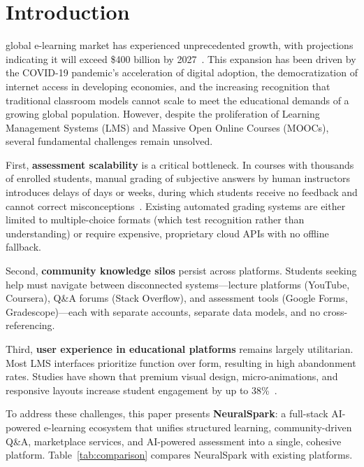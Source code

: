 \documentclass[conference]{IEEEtran}
\begin{document}
\section{Introduction}
 global e-learning market has experienced unprecedented growth, with projections indicating it will exceed \$400 billion by 2027~\cite{elearn_market}. This expansion has been driven by the COVID-19 pandemic's acceleration of digital adoption, the democratization of internet access in developing economies, and the increasing recognition that traditional classroom models cannot scale to meet the educational demands of a growing global population. However, despite the proliferation of Learning Management Systems (LMS) and Massive Open Online Courses (MOOCs), several fundamental challenges remain unsolved.

First, \textbf{assessment scalability} is a critical bottleneck. In courses with thousands of enrolled students, manual grading of subjective answers by human instructors introduces delays of days or weeks, during which students receive no feedback and cannot correct misconceptions~\cite{auto_grade_survey}. Existing automated grading systems are either limited to multiple-choice formats (which test recognition rather than understanding) or require expensive, proprietary cloud APIs with no offline fallback.

Second, \textbf{community knowledge silos} persist across platforms. Students seeking help must navigate between disconnected systems---lecture platforms (YouTube, Coursera), Q\&A forums (Stack Overflow), and assessment tools (Google Forms, Gradescope)---each with separate accounts, separate data models, and no cross-referencing.

Third, \textbf{user experience in educational platforms} remains largely utilitarian. Most LMS interfaces prioritize function over form, resulting in high abandonment rates. Studies have shown that premium visual design, micro-animations, and responsive layouts increase student engagement by up to 38\%~\cite{ux_engagement}.

To address these challenges, this paper presents \textbf{NeuralSpark}: a full-stack AI-powered e-learning ecosystem that unifies structured learning, community-driven Q\&A, marketplace services, and AI-powered assessment into a single, cohesive platform. Table~\ref{tab:comparison} compares NeuralSpark with existing platforms.
\end{document}
